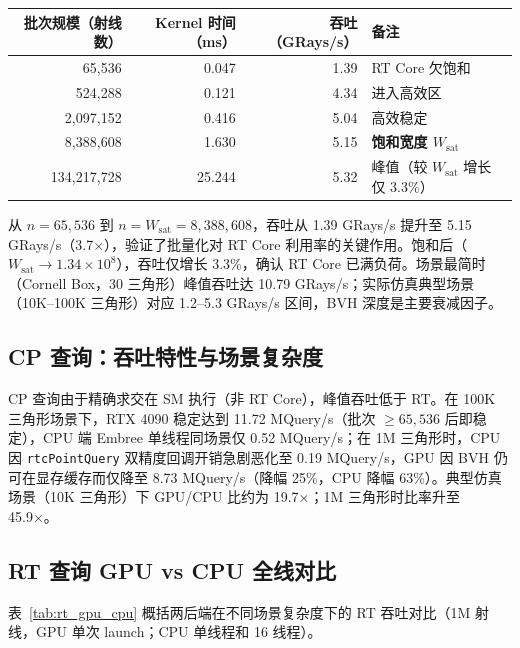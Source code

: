 \begin{table}[htbp]
  \centering
  \small
  \label{tab:rt_throughput}
  \begin{tabular}{rrrp{4.5cm}}
    \toprule
    批次规模（射线数） & Kernel 时间（ms） & 吞吐（GRays/s） & 备注 \\
    \midrule
    65,536     & 0.047 & 1.39  & RT Core 欠饱和 \\
    524,288    & 0.121 & 4.34  & 进入高效区 \\
    2,097,152  & 0.416 & 5.04  & 高效稳定 \\
    8,388,608  & 1.630 & 5.15  & \textbf{饱和宽度 $W_{\text{sat}}$} \\
    134,217,728 & 25.244 & 5.32 & 峰值（较 $W_{\text{sat}}$ 增长仅 3.3\%）\\
    \bottomrule
  \end{tabular}
\end{table}

从 $n = 65{,}536$ 到 $n = W_{\text{sat}} = 8{,}388{,}608$，吞吐从 1.39 GRays/s 提升至 5.15 GRays/s（3.7×），验证了批量化对 RT Core 利用率的关键作用。饱和后（$W_{\text{sat}} \to 1.34 \times 10^8$），吞吐仅增长 3.3\%，确认 RT Core 已满负荷。场景最简时（Cornell Box，30 三角形）峰值吞吐达 10.79 GRays/s；实际仿真典型场景（10K--100K 三角形）对应 1.2--5.3 GRays/s 区间，BVH 深度是主要衰减因子。

\subsection{CP 查询：吞吐特性与场景复杂度}

CP 查询由于精确求交在 SM 执行（非 RT Core），峰值吞吐低于 RT。在 100K 三角形场景下，RTX 4090 稳定达到 11.72 MQuery/s（批次 $\ge 65{,}536$ 后即稳定），CPU 端 Embree 单线程同场景仅 0.52 MQuery/s；在 1M 三角形时，CPU 因 \texttt{rtcPointQuery} 双精度回调开销急剧恶化至 0.19 MQuery/s，GPU 因 BVH 仍可在显存缓存而仅降至 8.73 MQuery/s（降幅 25\%，CPU 降幅 63\%）。典型仿真场景（10K 三角形）下 GPU/CPU 比约为 19.7×；1M 三角形时比率升至 45.9×。

\subsection{RT 查询 GPU vs CPU 全线对比}

表~\ref{tab:rt_gpu_cpu} 概括两后端在不同场景复杂度下的 RT 吞吐对比（1M 射线，GPU 单次 launch；CPU 单线程和 16 线程）。

